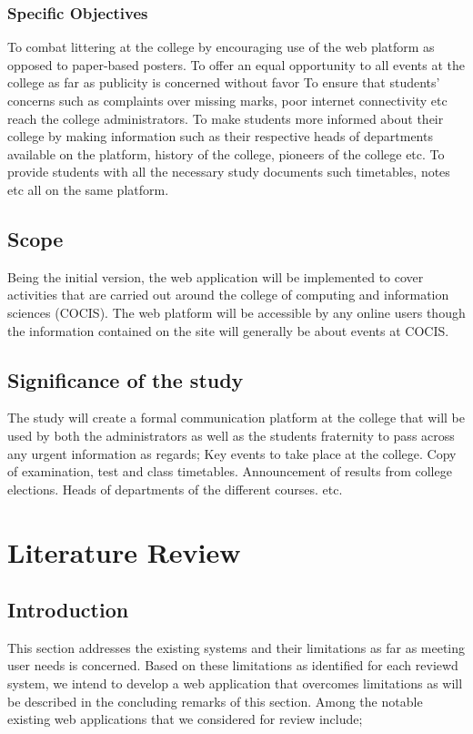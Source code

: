 \documentclass{article}
\begin{document}
\subsubsection{Specific Objectives}
To combat littering at the college by encouraging use of the web platform as opposed to paper-based posters.\newline
To offer an equal opportunity to all events at the college as far as publicity is concerned without favor\newline
To ensure that students’ concerns such as complaints over missing marks, poor internet connectivity etc reach the college administrators.\newline
To make students more informed about their college by making information such as their respective heads of departments available on the platform, history of the college, pioneers of the college etc.\newline
To provide students with all the necessary study documents such timetables, notes etc all on the same platform.

\subsection{Scope}
Being the initial version, the web application will be implemented to cover activities that are carried out around the college of computing and information sciences (COCIS). The web platform will be accessible by any online users though the information contained on the site will generally be about events at COCIS.

\subsection{Significance of the study}
The study will create a formal communication platform at the college that will be used by both the administrators as well as the students fraternity to pass across any urgent information as regards;
Key events to take place at the college.
Copy of examination, test and class timetables.
Announcement of results from college elections.
Heads of departments of the different courses. etc.  
\newpage
\section{Literature Review}
\subsection{Introduction}
This section addresses the existing systems and their limitations as far as meeting user needs is concerned. Based on these limitations as identified for each reviewd system, we intend to develop a web application that overcomes limitations as will be described in the concluding remarks of this section. Among the notable existing web applications that we considered for review include;
\end{document}
